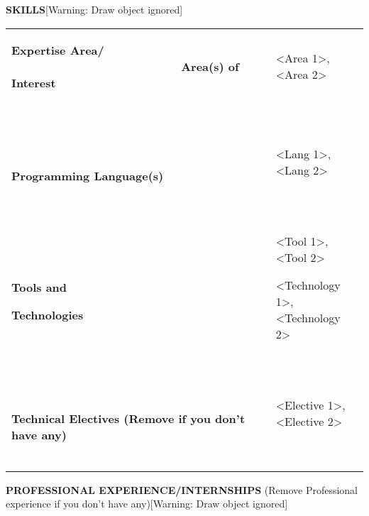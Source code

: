 \documentclass[a4paper]{article}
\begin{document}
\bigskip

\textbf{SKILLS}[Warning: Draw object ignored]


\bigskip

\begin{flushleft}
\tablehead{}
\begin{supertabular}{m{1.6212599in}m{4.89136in}}
\textbf{Expertise Area/
\ \ \ \ \ \ \ \ \ \ \ \ \ \ \ \ \ \ \ \ \ \ \ \ \ \ Area(s) of
Interest}

~
 &
{\textless}Area 1{\textgreater}, {\textless}Area 2{\textgreater}

~
\\
\textbf{Programming Language(s)} &
{\textless}Lang 1{\textgreater}, {\textless}Lang 2{\textgreater} 

~
\\
\textbf{Tools and}

\textbf{Technologies} &
{\textless}Tool 1{\textgreater}, {\textless}Tool 2{\textgreater}

{\textless}Technology 1{\textgreater}, {\textless}Technology
2{\textgreater}

~
\\
\textbf{Technical Electives (Remove if you don{\textquoteright}t have
any) \ \ \ \ \ \ \ \ \ \ \ \ \ \ \ \ \ \ \ \ \ \ \ \ \ \ } &
{\textless}Elective 1{\textgreater}, {\textless}Elective 2{\textgreater}

~
\\
\end{supertabular}
\end{flushleft}

\bigskip

\textbf{PROFESSIONAL EXPERIENCE/INTERNSHIPS} (Remove Professional
experience if you don{\textquoteright}t have any)[Warning: Draw object
ignored]
\end{document}
